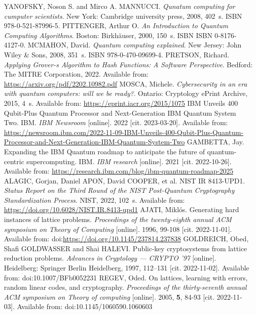 \begin{thebibliography}{99}
  YANOFSKY, Noson S. and Mirco A. MANNUCCI. \textit{Qunatum computing for cumputer scientists}. New York: Cambridge university press, 2008, 402~s. ISBN 978-0-521-87996-5.
  PITTENGER, Arthur O. \textit{An Introduction to Quantum Computing Algorithms}. Boston: Birkhäuser, 2000, 150~s. ISBN ISBN 0-8176-4127-0.
  MCMAHON, David. \textit{Quantum computing explained}. New Jersey: John Wiley \& Sons, 2008, 351~s. ISBN 978-0-470-09699-4.
  PRETSON, Richard. \textit{Applying Grover-s Algorithm to Hash Functions: A Software Perspective}. Bedford: The MITRE Corporation, 2022. Available from: \url{https://arxiv.org/pdf/2202.10982.pdf}
  MOSCA, Michele. \textit{Cybersecurity in an era with quantum computers: will we be ready?}. Ontario: Cryptology ePrint Archive, 2015, 4~s. Available from: \url{https://eprint.iacr.org/2015/1075}
  IBM Unveils 400 Qubit-Plus Quantum Processor and Next-Generation IBM Quantum System Two. IBM. \textit{IBM Newsroom} [online]. 2022 [cit. 2023-03-20]. Available from: \url{https://newsroom.ibm.com/2022-11-09-IBM-Unveils-400-Qubit-Plus-Quantum-Processor-and-Next-Generation-IBM-Quantum-System-Two}
  GAMBETTA, Jay. Expanding the IBM Quantum roadmap to anticipate the future of quantum-centric supercomputing. IBM. \textit{IBM research} [online]. 2021 [cit. 2022-10-26]. Available from: \url{https://research.ibm.com/blog/ibm-quantum-roadmap-2025}
  ALAGIC, Gorjan, Daniel APON, David COOPER, et al. NIST IR 8413-UPD1. \textit{Status Report on the Third Round of the NIST Post-Quantum Cryptography Standardization Process}. NIST, 2022, 102~s. Available from: \url{https://doi.org/10.6028/NIST.IR.8413-upd1}
  AJATI, Miklós. Generating hard instances of lattice problems. \textit{Proceedings of the twenty-eighth annual ACM symposium on Theory of Computing} [online]. 1996, 99-108 [cit. 2022-11-01]. Available from: doi:\url{https://doi.org/10.1145/237814.237838}
  GOLDREICH, Obed, Shafi GOLDWASSER and Shai HALEVI. Public-key cryptosystems from lattice reduction problems. \textit{Advances in Cryptology --- CRYPTO '97} [online]. Heidelberg: Springer Berlin Heidelberg, 1997, 112--131 [cit. 2022-11-02]. Available from: doi:10.1007/BFb0052231
  REGEV, Oded. On lattices, learning with errors, random linear codes, and cryptography. \textit{Proceedings of the thirty-seventh annual ACM symposium on Theory of computing} [online]. 2005, \textbf{5}, 84-93 [cit. 2022-11-03]. Available from: doi:10.1145/1060590.1060603

\end{thebibliography}
